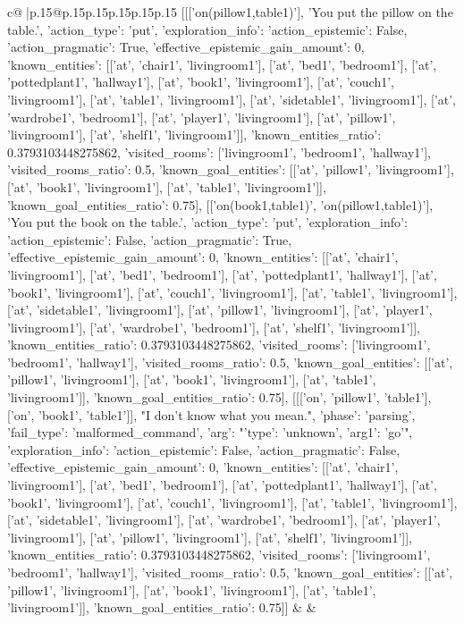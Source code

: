 \documentclass{article}
\begin{document}
{\begin{supertabular}{c@{$\;$}|p{.15\linewidth}@{}p{.15\linewidth}p{.15\linewidth}p{.15\linewidth}p{.15\linewidth}p{.15\linewidth}}
{{{	 [[['on(pillow1,table1)'], 'You put the pillow on the table.', {'action_type': 'put', 'exploration_info': {'action_epistemic': False, 'action_pragmatic': True, 'effective_epistemic_gain_amount': 0, 'known_entities': [['at', 'chair1', 'livingroom1'], ['at', 'bed1', 'bedroom1'], ['at', 'pottedplant1', 'hallway1'], ['at', 'book1', 'livingroom1'], ['at', 'couch1', 'livingroom1'], ['at', 'table1', 'livingroom1'], ['at', 'sidetable1', 'livingroom1'], ['at', 'wardrobe1', 'bedroom1'], ['at', 'player1', 'livingroom1'], ['at', 'pillow1', 'livingroom1'], ['at', 'shelf1', 'livingroom1']], 'known_entities_ratio': 0.3793103448275862, 'visited_rooms': ['livingroom1', 'bedroom1', 'hallway1'], 'visited_rooms_ratio': 0.5, 'known_goal_entities': [['at', 'pillow1', 'livingroom1'], ['at', 'book1', 'livingroom1'], ['at', 'table1', 'livingroom1']], 'known_goal_entities_ratio': 0.75}}], [['on(book1,table1)', 'on(pillow1,table1)'], 'You put the book on the table.', {'action_type': 'put', 'exploration_info': {'action_epistemic': False, 'action_pragmatic': True, 'effective_epistemic_gain_amount': 0, 'known_entities': [['at', 'chair1', 'livingroom1'], ['at', 'bed1', 'bedroom1'], ['at', 'pottedplant1', 'hallway1'], ['at', 'book1', 'livingroom1'], ['at', 'couch1', 'livingroom1'], ['at', 'table1', 'livingroom1'], ['at', 'sidetable1', 'livingroom1'], ['at', 'pillow1', 'livingroom1'], ['at', 'player1', 'livingroom1'], ['at', 'wardrobe1', 'bedroom1'], ['at', 'shelf1', 'livingroom1']], 'known_entities_ratio': 0.3793103448275862, 'visited_rooms': ['livingroom1', 'bedroom1', 'hallway1'], 'visited_rooms_ratio': 0.5, 'known_goal_entities': [['at', 'pillow1', 'livingroom1'], ['at', 'book1', 'livingroom1'], ['at', 'table1', 'livingroom1']], 'known_goal_entities_ratio': 0.75}}], [[['on', 'pillow1', 'table1'], ['on', 'book1', 'table1']], "I don't know what you mean.", {'phase': 'parsing', 'fail_type': 'malformed_command', 'arg': "{'type': 'unknown', 'arg1': 'go'}", 'exploration_info': {'action_epistemic': False, 'action_pragmatic': False, 'effective_epistemic_gain_amount': 0, 'known_entities': [['at', 'chair1', 'livingroom1'], ['at', 'bed1', 'bedroom1'], ['at', 'pottedplant1', 'hallway1'], ['at', 'book1', 'livingroom1'], ['at', 'couch1', 'livingroom1'], ['at', 'table1', 'livingroom1'], ['at', 'sidetable1', 'livingroom1'], ['at', 'wardrobe1', 'bedroom1'], ['at', 'player1', 'livingroom1'], ['at', 'pillow1', 'livingroom1'], ['at', 'shelf1', 'livingroom1']], 'known_entities_ratio': 0.3793103448275862, 'visited_rooms': ['livingroom1', 'bedroom1', 'hallway1'], 'visited_rooms_ratio': 0.5, 'known_goal_entities': [['at', 'pillow1', 'livingroom1'], ['at', 'book1', 'livingroom1'], ['at', 'table1', 'livingroom1']], 'known_goal_entities_ratio': 0.75}}]] 
	  } 
	   } 
	   } 
	 & & \\ 
 


\end{supertabular}}
\end{document}
